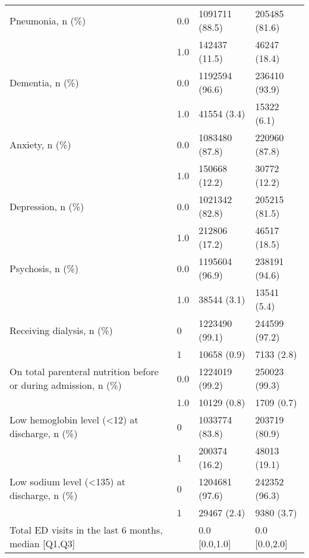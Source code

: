 \begin{tabular}{llll}
Pneumonia, n (\%) & 0.0 &                        1091711 (88.5) &      205485 (81.6) \\
                                       & 1.0 &                         142437 (11.5) &       46247 (18.4) \\
Dementia, n (\%) & 0.0 &                        1192594 (96.6) &      236410 (93.9) \\
                                       & 1.0 &                           41554 (3.4) &        15322 (6.1) \\
Anxiety, n (\%) & 0.0 &                        1083480 (87.8) &      220960 (87.8) \\
                                       & 1.0 &                         150668 (12.2) &       30772 (12.2) \\
Depression, n (\%) & 0.0 &                        1021342 (82.8) &      205215 (81.5) \\
                                       & 1.0 &                         212806 (17.2) &       46517 (18.5) \\
Psychosis, n (\%) & 0.0 &                        1195604 (96.9) &      238191 (94.6) \\
                                       & 1.0 &                           38544 (3.1) &        13541 (5.4) \\
Receiving dialysis, n (\%) & 0 &                        1223490 (99.1) &      244599 (97.2) \\
                                       & 1 &                           10658 (0.9) &         7133 (2.8) \\
On total parenteral nutrition before or during admission, n (\%) & 0.0 &                        1224019 (99.2) &      250023 (99.3) \\
                                       & 1.0 &                           10129 (0.8) &         1709 (0.7) \\
Low hemoglobin level (<12) at discharge, n (\%) & 0 &                        1033774 (83.8) &      203719 (80.9) \\
                                       & 1 &                         200374 (16.2) &       48013 (19.1) \\
Low sodium level (<135) at discharge, n (\%) & 0 &                        1204681 (97.6) &      242352 (96.3) \\
                                       & 1 &                           29467 (2.4) &         9380 (3.7) \\
Total ED visits in the last 6 months, median [Q1,Q3] &   &                         0.0 [0.0,1.0] &      0.0 [0.0,2.0] \\

\end{tabular}
